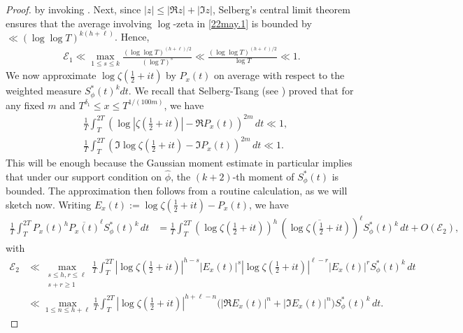 \documentclass[12pt,oneside,english,a4paper]{amsart}
\theoremstyle{remark}
\numberwithin{equation}{section}
\newcommand{\Starphi}{S_\phi^*}
\begin{document}
\begin{proof}
    by invoking \cite[Theorem 2.6]{HughesRudnick}.
    Next, since $|z| \leq |\Re z|+|\Im z|$, Selberg's central limit theorem ensures that the average involving $\log$-zeta in \eqref{22may.1} is bounded by $\ll (\log\log T)^{k(h+\ell)}$. Hence, 
    \begin{align}\label{28feb.2} 
        \mathcal E_1 
        \ll \max_{1\leq s\leq k} \frac{(\log\log T)^{(h+\ell)/2}}{(\log T)^s} 
        \ll \frac{(\log\log T)^{(h+\ell)/2}}{\log T}
        \ll 1.
    \end{align}
    We now approximate $\log\zeta(\frac{1}{2}+it)$ by $P_x(t)$ on average with respect to the weighted measure $\Starphi(t)^kdt$. We recall that Selberg-Tsang (see \cite[Theorem 5.1]{Tsang1}) proved that for any fixed $m$ and $T^{\delta_1} \le x \le T^{1/(100 m)}$, we have
    \begin{equation}\begin{split}\label{TsangErrorRevised}
        &\frac{1}{T}\int_T^{2 T} (\log|\zeta( \tfrac{1}{2}+it )| - \Re P_x(t))^{2 m} \, dt \ll 1,\\
        &\frac{1}{T}\int_T^{2 T} (\Im\log\zeta( \tfrac{1}{2}+it ) - \Im P_x(t))^{2 m} \, dt \ll 1.
    \end{split}\end{equation}
    This will be enough because the Gaussian moment estimate \cite[Theorem 1.1]{HughesRudnick} in particular implies that under our support condition on $\hat \phi$, the $(k+2)$-th moment of $\Starphi(t)$ is bounded. The approximation then follows from a routine calculation, as we will sketch now.
    Writing $E_x(t) := \log\zeta(\tfrac12+it) - P_x(t)$,
    we have
    \begin{align*}
        \frac{1}{T}\int_T^{2 T} P_x(t)^h \overline{P_x(t)}^\ell \Starphi(t)^k\, dt &= \frac{1}{T}\int_T^{2 T} ( \log \zeta(\tfrac12+ i t))^h \, (\overline{\log\zeta(\tfrac12+it)} )^\ell \Starphi (t)^k \, dt + O(\mathcal E_2),
    \end{align*}
    with
    \begin{align*}
        \mathcal E_2 &\ll \max_{\substack{s\leq h,r\leq \ell \\ s+r\geq 1}}
        \frac{1}{T} \int_T^{2 T}|\log\zeta( \tfrac12+ i t) |^{h-s} |E_x(t)|^s |\log\zeta(\tfrac12+it)|^{\ell-r} |E_x(t)|^r \Starphi(t)^k \, dt\\
        &\ll \max_{1\leq n \leq h+\ell}
        \frac{1}{T} \int_T^{2 T} |\log\zeta( \tfrac12+ i t)|^{h+\ell-n} \Big(|\Re E_x(t)|^{n} + |\Im E_x(t)|^n \Big) \Starphi(t)^k \, dt.
        \end{align*}

\end{proof}
\end{document}
